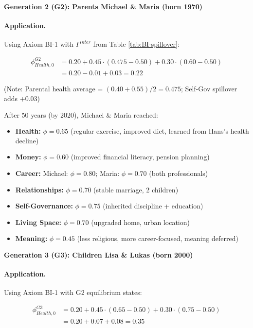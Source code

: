 \textbf{Generation 2 (G2): Parents Michael \& Maria (born 1970)}

\paragraph{Application.} Using Axiom BI-1 with $\Gamma^{inter}$ from Table \ref{tab:BI-spillover}:

\begin{align}
\phi^{G2}_{Health,0} &= 0.20 + 0.45 \cdot (0.475 - 0.50) + 0.30 \cdot (0.60 - 0.50) \\
&= 0.20 - 0.01 + 0.03 = 0.22
\end{align}

(Note: Parental health average = $(0.40 + 0.55)/2 = 0.475$; Self-Gov spillover adds +0.03)

After 50 years (by 2020), Michael \& Maria reached:
\begin{itemize}[nosep]
\item \textbf{Health:} $\phi = 0.65$ (regular exercise, improved diet, learned from Hans's health decline)
\item \textbf{Money:} $\phi = 0.60$ (improved financial literacy, pension planning)
\item \textbf{Career:} Michael: $\phi = 0.80$; Maria: $\phi = 0.70$ (both professionals)
\item \textbf{Relationships:} $\phi = 0.70$ (stable marriage, 2 children)
\item \textbf{Self-Governance:} $\phi = 0.75$ (inherited discipline + education)
\item \textbf{Living Space:} $\phi = 0.70$ (upgraded home, urban location)
\item \textbf{Meaning:} $\phi = 0.45$ (less religious, more career-focused, meaning deferred)
\end{itemize}

\textbf{Generation 3 (G3): Children Lisa \& Lukas (born 2000)}

\paragraph{Application.} Using Axiom BI-1 with G2 equilibrium states:

\begin{align}
\phi^{G3}_{Health,0} &= 0.20 + 0.45 \cdot (0.65 - 0.50) + 0.30 \cdot (0.75 - 0.50) \\
&= 0.20 + 0.07 + 0.08 = 0.35
\end{align}


